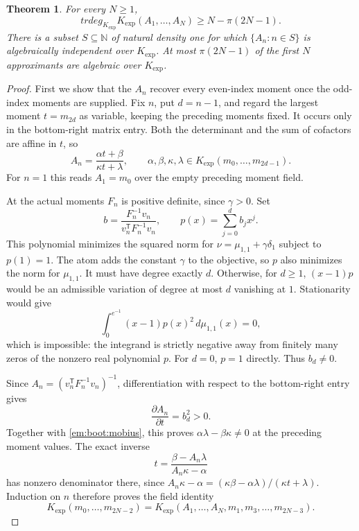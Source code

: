 \documentclass[11pt,a4paper]{article}
\newtheorem{theorem}{Theorem}[section]
\theoremstyle{definition}
\theoremstyle{remark}
\theoremstyle{plain}
\numberwithin{equation}{section}
\def\operatorname#1{#1}\def\mathrm#1{#1}}
\begin{document}
\begin{theorem}\label{em:boot:hankel-independent}
For every $N\ge1$,
\begin{equation}\label{em:boot:hankel-rank}
 \operatorname{trdeg}_{K_{\exp}}
 K_{\exp}(A_1,\ldots,A_N)\ge N-\pi(2N-1).
\end{equation}
There is a subset $S\subseteq\mathbb N$ of natural density one for which
$\{A_n:n\in S\}$ is algebraically independent over $K_{\exp}$.
At most $\pi(2N-1)$ of the first $N$ approximants are algebraic over
$K_{\exp}$.
\end{theorem}
\begin{proof}
First we show that the $A_n$ recover every even-index moment once the
odd-index moments are supplied. Fix $n$, put $d=n-1$, and regard the
largest moment $t=m_{2d}$ as variable, keeping the preceding moments
fixed. It occurs only in the bottom-right matrix entry. Both the
determinant and the sum of cofactors are affine in $t$, so
\begin{equation}\label{em:boot:mobius}
 A_n=\frac{\alpha t+\beta}{\kappa t+\lambda},
 \qquad
 \alpha,\beta,\kappa,\lambda\in
 K_{\exp}(m_0,\ldots,m_{2d-1}).
\end{equation}
For $n=1$ this reads $A_1=m_0$ over the empty preceding moment field.

At the actual moments $F_n$ is positive definite, since $\gamma>0$. Set
\[
 b=\frac{F_n^{-1}v_n}{v_n^{\mathsf T}F_n^{-1}v_n},\qquad
 p(x)=\sum_{j=0}^d b_jx^j.
\]
This polynomial minimizes the squared norm for
$\nu=\mu_{1,1}+\gamma\delta_1$ subject to $p(1)=1$. The atom adds the
constant $\gamma$ to the objective, so $p$ also minimizes the norm for
$\mu_{1,1}$. It must have degree exactly $d$. Otherwise, for $d\ge1$,
$(x-1)p$ would be an admissible variation of degree at most $d$
vanishing at $1$. Stationarity would give
\[
 \int_0^{e^{-1}}(x-1)p(x)^2\,d\mu_{1,1}(x)=0,
\]
which is impossible: the integrand is strictly negative away from
finitely many zeros of the nonzero real polynomial $p$.
For $d=0$, $p=1$ directly. Thus $b_d\ne0$.

Since $A_n=(v_n^{\mathsf T}F_n^{-1}v_n)^{-1}$, differentiation with
respect to the bottom-right entry gives
\[
 \frac{\partial A_n}{\partial t}=b_d^2>0.
\]
Together with \eqref{em:boot:mobius}, this proves
$\alpha\lambda-\beta\kappa\ne0$ at the preceding moment values.
The exact inverse
\[
 t=\frac{\beta-A_n\lambda}{A_n\kappa-\alpha}
\]
has nonzero denominator there, since
$A_n\kappa-\alpha=(\kappa\beta-\alpha\lambda)/
(\kappa t+\lambda)$. Induction on $n$ therefore proves the field identity
\begin{equation}\label{em:boot:moment-recovery}
 K_{\exp}(m_0,\ldots,m_{2N-2})
 =K_{\exp}(A_1,\ldots,A_N,m_1,m_3,\ldots,m_{2N-3}).
\end{equation}


\end{proof}
\end{document}
